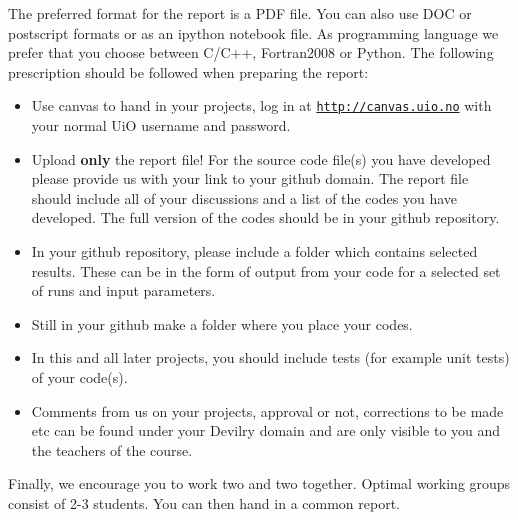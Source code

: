 \documentclass[%
oneside,                 %
final,                   %
10pt]{article}
\begin{document}
The preferred format for the report is a PDF file. You can also use DOC or postscript formats or as an ipython notebook file.  As programming language we prefer that you choose between C/C++, Fortran2008 or Python. The following prescription should be followed when preparing the report:

\begin{itemize}
  \item Use canvas to hand in your projects, log in  at  \href{{http://canvas.uio.no}}{\nolinkurl{http://canvas.uio.no}} with your normal UiO username and password.

  \item Upload \textbf{only} the report file!  For the source code file(s) you have developed please provide us with your link to your github domain.  The report file should include all of your discussions and a list of the codes you have developed.  The full version of the codes should be in your github repository.

  \item In your github repository, please include a folder which contains selected results. These can be in the form of output from your code for a selected set of runs and input parameters.

  \item Still in your github make a folder where you place your codes.

  \item In this and all later projects, you should include tests (for example unit tests) of your code(s).

  \item Comments  from us on your projects, approval or not, corrections to be made  etc can be found under your Devilry domain and are only visible to you and the teachers of the course.
\end{itemize}

\noindent
Finally,
we encourage you to work two and two together. Optimal working groups consist of
2-3 students. You can then hand in a common report.


\end{document}
